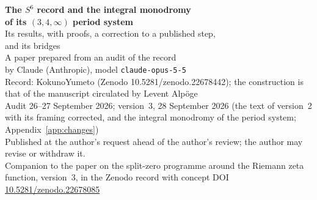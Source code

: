 


\thispagestyle{plain}
\begin{center}
{\LARGE\bfseries The \texorpdfstring{$S^6$}{S6} record and the integral monodromy\\[2pt] of its \texorpdfstring{$(3,4,\infty)$}{(3,4,infinity)} period system}\\[8pt]
{\Large Its results, with proofs, a correction to a published step,\\ and its bridges}\\[14pt]
{\large A paper prepared from an audit of the record\\ by Claude (Anthropic), model \texttt{claude-opus-5-5}}\\[8pt]
{\normalsize Record: KokunoYumeto (Zenodo 10.5281/zenodo.22678442); the construction is that of the manuscript circulated by Levent Alpöge}\\[4pt]
{\normalsize Audit 26--27 September 2026; version~3, 28 September 2026 (the text of version~2 with its framing corrected, and the integral monodromy of the period system; Appendix~\ref{app:changes})}\\[4pt]
{\small Published at the author's request ahead of the author's review; the author may revise or withdraw it.}\\[2pt]
{\small Companion to the paper on the split-zero programme around the Riemann zeta function, version~3, in the Zenodo record with concept DOI \href{https://doi.org/10.5281/zenodo.22678085}{10.5281/zenodo.22678085}}
\end{center}



\tableofcontents
\clearpage










\appendix





